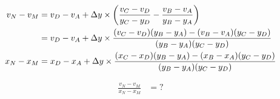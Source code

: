 \begin{align*}
v_N - v_M & = v_D - v_A + \Delta y \times \left(\frac{v_C - v_D}{y_C - y_D} - \frac{v_B - v_A}{y_B - y_A}\right) \\
& = v_D - v_A + \Delta y \times \frac{(v_C - v_D)(y_B - y_A) - (v_B - v_A)(y_C - y_D)}{(y_B - y_A)(y_C - y_D)}
\\
x_N - x_M & = x_D - x_A + \Delta y \times \frac{(x_C - x_D)(y_B - y_A) - (x_B - x_A)(y_C - y_D)}{(y_B - y_A)(y_C - y_D)}
\end{align*}

\begin{align*}
\frac{v_N - v_M}{x_N - x_M} & = ? 
\end{align*}
